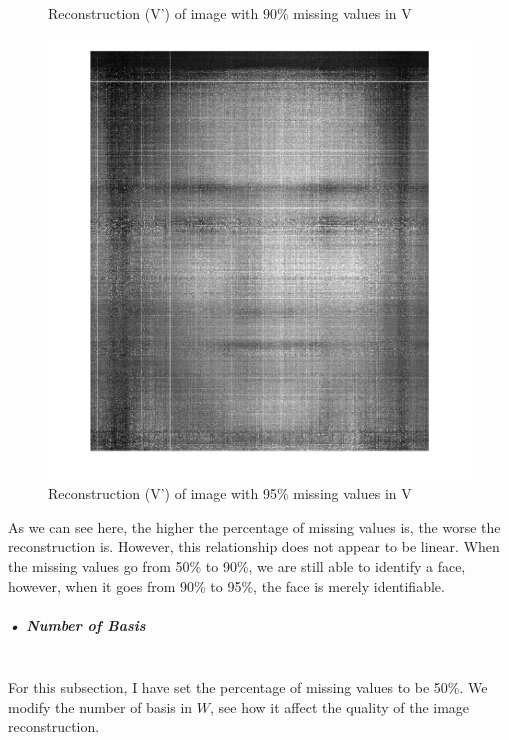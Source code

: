\documentclass[11pt]{article} %
\begin{document}
\begin{figure}[H]
  \caption{Reconstruction (V') of image with 90\% missing values in V}\label{fig:awesome_image2}
\endminipage\hfill
{}%
  \includegraphics[width=\linewidth]{mySelfie95M100R.png}
  \caption{Reconstruction (V') of image with 95\% missing values in V}\label{fig:awesome_image3}
\endminipage
\end{figure}
As we can see here, the higher the percentage of missing values is, the worse the reconstruction is. However, this relationship does not appear to be linear. When the missing values go from 50\% to 90\%, we are still able to identify a face, however, when it goes from 90\% to 95\%, the face is merely identifiable.
\subparagraph{• Number of Basis}\mbox{}\\
For this subsection, I have set the percentage of missing values to be 50\%. We modify the number of basis in $W$, see how it affect the quality of the image reconstruction.
\end{document}
